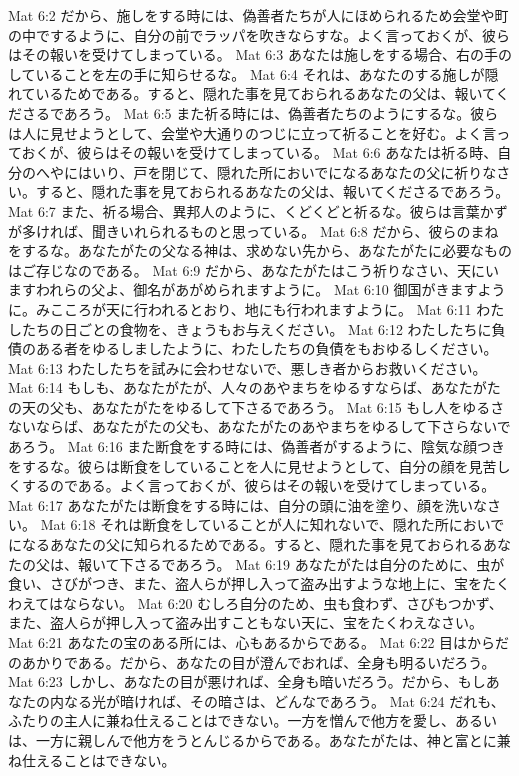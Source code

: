 Mat 6:2  だから、施しをする時には、偽善者たちが人にほめられるため会堂や町の中でするように、自分の前でラッパを吹きならすな。よく言っておくが、彼らはその報いを受けてしまっている。
Mat 6:3  あなたは施しをする場合、右の手のしていることを左の手に知らせるな。
Mat 6:4  それは、あなたのする施しが隠れているためである。すると、隠れた事を見ておられるあなたの父は、報いてくださるであろう。
Mat 6:5  また祈る時には、偽善者たちのようにするな。彼らは人に見せようとして、会堂や大通りのつじに立って祈ることを好む。よく言っておくが、彼らはその報いを受けてしまっている。
Mat 6:6  あなたは祈る時、自分のへやにはいり、戸を閉じて、隠れた所においでになるあなたの父に祈りなさい。すると、隠れた事を見ておられるあなたの父は、報いてくださるであろう。
Mat 6:7  また、祈る場合、異邦人のように、くどくどと祈るな。彼らは言葉かずが多ければ、聞きいれられるものと思っている。
Mat 6:8  だから、彼らのまねをするな。あなたがたの父なる神は、求めない先から、あなたがたに必要なものはご存じなのである。
Mat 6:9  だから、あなたがたはこう祈りなさい、天にいますわれらの父よ、御名があがめられますように。
Mat 6:10  御国がきますように。みこころが天に行われるとおり、地にも行われますように。
Mat 6:11  わたしたちの日ごとの食物を、きょうもお与えください。
Mat 6:12  わたしたちに負債のある者をゆるしましたように、わたしたちの負債をもおゆるしください。
Mat 6:13  わたしたちを試みに会わせないで、悪しき者からお救いください。
Mat 6:14  もしも、あなたがたが、人々のあやまちをゆるすならば、あなたがたの天の父も、あなたがたをゆるして下さるであろう。
Mat 6:15  もし人をゆるさないならば、あなたがたの父も、あなたがたのあやまちをゆるして下さらないであろう。
Mat 6:16  また断食をする時には、偽善者がするように、陰気な顔つきをするな。彼らは断食をしていることを人に見せようとして、自分の顔を見苦しくするのである。よく言っておくが、彼らはその報いを受けてしまっている。
Mat 6:17  あなたがたは断食をする時には、自分の頭に油を塗り、顔を洗いなさい。
Mat 6:18  それは断食をしていることが人に知れないで、隠れた所においでになるあなたの父に知られるためである。すると、隠れた事を見ておられるあなたの父は、報いて下さるであろう。
Mat 6:19  あなたがたは自分のために、虫が食い、さびがつき、また、盗人らが押し入って盗み出すような地上に、宝をたくわえてはならない。
Mat 6:20  むしろ自分のため、虫も食わず、さびもつかず、また、盗人らが押し入って盗み出すこともない天に、宝をたくわえなさい。
Mat 6:21  あなたの宝のある所には、心もあるからである。
Mat 6:22  目はからだのあかりである。だから、あなたの目が澄んでおれば、全身も明るいだろう。
Mat 6:23  しかし、あなたの目が悪ければ、全身も暗いだろう。だから、もしあなたの内なる光が暗ければ、その暗さは、どんなであろう。
Mat 6:24  だれも、ふたりの主人に兼ね仕えることはできない。一方を憎んで他方を愛し、あるいは、一方に親しんで他方をうとんじるからである。あなたがたは、神と富とに兼ね仕えることはできない。
